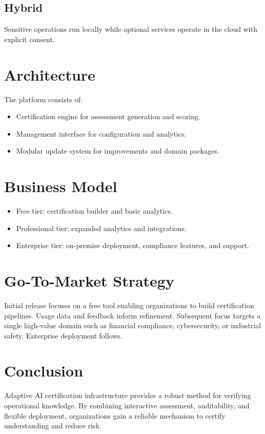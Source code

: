 \documentclass[11pt]{article}
\begin{document}
\subsection{Hybrid}
Sensitive operations run locally while optional services operate in the cloud with explicit consent.

\section{Architecture}
The platform consists of:
\begin{itemize}[noitemsep]
\item Certification engine for assessment generation and scoring.
\item Management interface for configuration and analytics.
\item Modular update system for improvements and domain packages.
\end{itemize}

\section{Business Model}
\begin{itemize}[noitemsep]
\item Free tier: certification builder and basic analytics.
\item Professional tier: expanded analytics and integrations.
\item Enterprise tier: on-premise deployment, compliance features, and support.
\end{itemize}

\section{Go-To-Market Strategy}
Initial release focuses on a free tool enabling organizations to build certification pipelines. Usage data and feedback inform refinement. Subsequent focus targets a single high-value domain such as financial compliance, cybersecurity, or industrial safety. Enterprise deployment follows.

\section{Conclusion}
Adaptive AI certification infrastructure provides a robust method for verifying operational knowledge. By combining interactive assessment, auditability, and flexible deployment, organizations gain a reliable mechanism to certify understanding and reduce risk.
\end{document}
